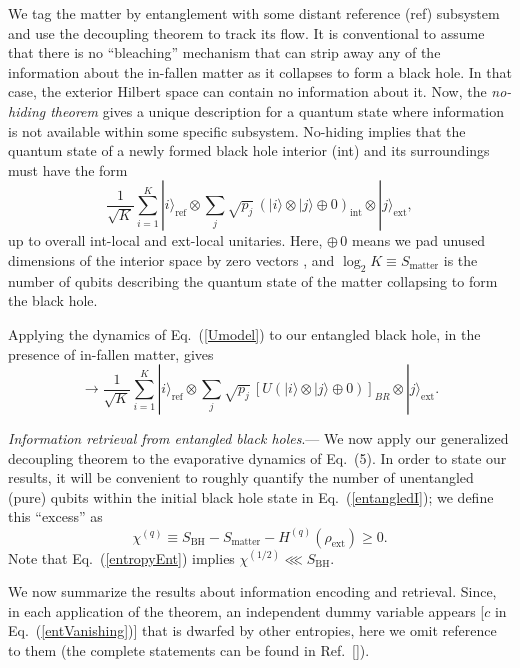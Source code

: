 \documentclass[twocolumn,aps,showpacs,prl]{revtex4}
\begin{document}
We tag the matter by entanglement with some distant reference (ref)
subsystem \cite{me,Hayden07} and use the decoupling theorem to
track its flow. It is conventional to assume that there is no ``bleaching''
mechanism \cite{bleach} that can strip away any of the
information about the in-fallen matter as it collapses to form a
black hole. In that case, the exterior Hilbert space can contain
no information about it. Now, the {\it no-hiding theorem} \cite{me}
gives a unique description for a quantum state where information is
not available within some specific subsystem. No-hiding implies
that the quantum state of a newly formed black hole interior
(int) and its surroundings must have the form
\begin{equation}
\frac{1}{\sqrt{K}}\sum_{i=1}^K |i\rangle_{\text{ref}}\otimes
\sum_{j}\sqrt{p_j}\,(|i\rangle\otimes |j\rangle\oplus 0)_{\text{int}}
\otimes|j\rangle_{\text{ext}}, \tag{5a}\label{entangledI}
\end{equation}
up to overall int-local and ext-local unitaries. Here, $\oplus\, 0$ means
we pad unused dimensions of the interior space by zero vectors \cite{me},
and $\log_2 K\equiv S_{\text{matter}}$ is the number of qubits
describing the quantum state of the matter collapsing to form the black
hole.  

Applying the dynamics of Eq.~(\ref{Umodel}) to our entangled black hole,
in the presence of in-fallen matter, gives
\begin{equation}
\rightarrow
\frac{1}{\sqrt{K}}\sum_{i=1}^K |i\rangle_{\text{ref}}\otimes
\!\sum_{j}\sqrt{p_j}\,[U(|i\rangle\otimes |j\rangle\oplus 0)]_{BR}
\otimes|j\rangle_{\text{ext}}.
\tag{5b}\label{entangledF}
\end{equation}

{\it Information retrieval from entangled black holes}.---%
\setcounter{equation}{5}%
We now apply our generalized decoupling theorem to the
evaporative dynamics of Eq.~(5). In order to state our
results, it will be convenient to roughly quantify the number of
unentangled (pure) qubits within the initial black hole state
in Eq.~(\ref{entangledI}); we define this ``excess'' as
\begin{equation}
\chi^{(q)}\equiv S_{\text{BH}} - S_{\text{matter}}
 -H^{(q)}(\rho_{\text{ext}})\ge 0.  \label{chiq}
\end{equation}
Note that Eq.~(\ref{entropyEnt}) implies
$\chi^{(1/2)} \lll S_{\text{BH}}$.

We now summarize the results about information encoding and retrieval. 
Since, in each application of the theorem, an independent dummy variable
appears [$c$ in Eq.~(\ref{entVanishing})] that is dwarfed by
other entropies, here we omit reference to them (the complete 
statements can be found in Ref.~[]).
\end{document}
